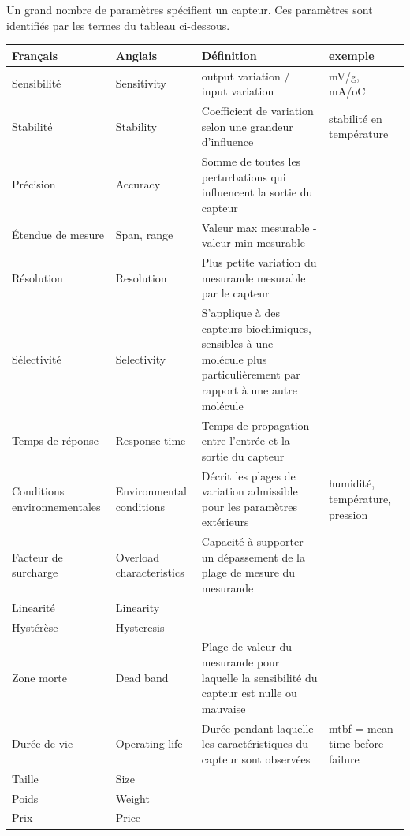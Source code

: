 Un grand nombre de paramètres spécifient un capteur. Ces paramètres sont identifiés par les termes du tableau ci-dessous.
\begin {center}
\begin{tabular}{|p{2.2cm}|p{2.8cm}|p{6.8cm}|p{2.4cm}|}
\hline
\textbf{Français} &	\textbf{Anglais} &	\textbf{Définition} &	\textbf{exemple} \\
\hline
\hline
Sensibilité &	Sensitivity &	output variation / input variation	 & mV/g, mA/oC \\
\hline
Stabilité &	Stability &	Coefficient de variation selon une grandeur d'influence &	stabilité en température \\
\hline
Précision &	Accuracy &	Somme de toutes les perturbations qui influencent la sortie du capteur	 &  \\
\hline
Étendue de mesure &	Span, range &	Valeur max mesurable - valeur min mesurable &	  \\
\hline
Résolution &	Resolution &	Plus petite variation du mesurande mesurable par le capteur &	  \\
\hline
Sélectivité &	Selectivity &	S'applique à des capteurs biochimiques, sensibles à une molécule plus particulièrement par rapport à une autre molécule &	  \\
\hline
Temps de réponse &	Response time &	Temps de propagation entre l'entrée et la sortie du capteur &	  \\
\hline
Conditions environnementales &	Environmental conditions &	Décrit les plages de variation admissible pour les paramètres extérieurs &	humidité, température, pression \\
\hline
Facteur de surcharge &	Overload characteristics &	Capacité à supporter un dépassement de la plage de mesure du mesurande & \\
\hline
Linearité &	Linearity & &	 	  \\
\hline
Hystérèse &	Hysteresis & &	 	  \\
\hline
Zone morte &	Dead band &	Plage de valeur du mesurande pour laquelle la sensibilité du capteur est nulle ou mauvaise &	 \\
\hline
Durée de vie &	Operating life &	Durée pendant laquelle les caractéristiques du capteur sont observées &	mtbf = mean time before failure \\
\hline
Taille & Size & &	 	  \\
\hline
Poids &	Weight & &	 	  \\
\hline
Prix &	Price & &	 	  \\
\hline
\end{tabular}
\end{center}

